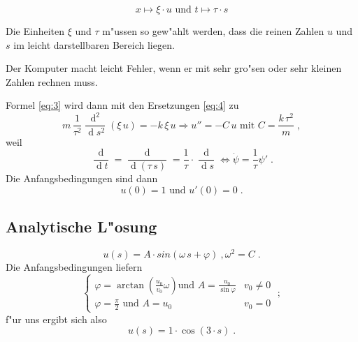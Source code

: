 \documentclass[a4paper]{book}
\newcommand{\diff}{\ensuremath{\operatorname d}}
\newcommand{\folgt}{\ensuremath{\Rightarrow}}
\newcommand{\gdw}{\ensuremath{\Leftrightarrow}}
\begin{document}
\begin{equation}
  \label{eq:4}
  x \mapsto \xi \cdot u \text{ und } t \mapsto \tau \cdot s 
\tag{1.10}
\end{equation}

\begin{Wichtig}
  Die Einheiten $\xi$ und $\tau$ m"ussen so gew"ahlt werden, dass die
  reinen Zahlen $u$ und $s$ im leicht darstellbaren Bereich liegen.
\end{Wichtig}
Der Komputer macht leicht Fehler, wenn er mit sehr gro"sen oder sehr
kleinen Zahlen rechnen muss.

Formel \eqref{eq:3} wird dann mit den Ersetzungen \eqref{eq:4} zu
\begin{equation}
  \label{eq:5}
 m \, \frac{1}{\tau^2} \frac{\diff ^2}{\diff s^2}  (\xi \, u) = - k \,
 \xi \, u \folgt
u'' = -C \, u \text{ mit } C = \frac{k \, \tau^2}{m}\;,
\tag{1.11}
\end{equation}
weil
\begin{equation}
  \label{eq:6}
  \frac{\diff }{\diff t} = \frac{\diff }{\diff (\tau \, s)} =
  \frac{1}{\tau} \cdot \frac{\diff }{\diff s}
\gdw
\dot \psi = \frac{1}{\tau} \psi'
\;.
\tag{1.10$\dagger$}
\end{equation}
Die Anfangsbedingungen sind dann
\begin{equation}
  \label{eq:7}
  u(0) = 1 \text{ und } u'(0) = 0\;. \tag{1.12}
\end{equation}



\subsection{Analytische L"osung}
\label{sec:analytische_losung}

\begin{equation}
  \label{eq:8}
  u(s) = A \cdot sin(\omega \, s + \varphi) ~ , \omega^2 = C \;.
\tag{1.13}
\end{equation}
Die Anfangsbedingungen liefern
\begin{equation}
  \label{eq:9}
  \begin{cases}
      \varphi = \arctan \left ( \frac{u_0}{v_0} \omega \right ) \text{
      und } A = \frac{u_0}{\sin \varphi} & v_0 \neq 0\\
    \varphi = \frac{\pi}{2} \text{ und } A = u_0 & v_0 = 0 
\tag{1.14}
  \end{cases} \;;
\end{equation}
f"ur uns ergibt sich also
\begin{equation}
  \label{eq:10}
  u(s) = 1 \cdot \cos( 3 \cdot s) \;.
\tag{1.15}
\end{equation}
\end{document}
